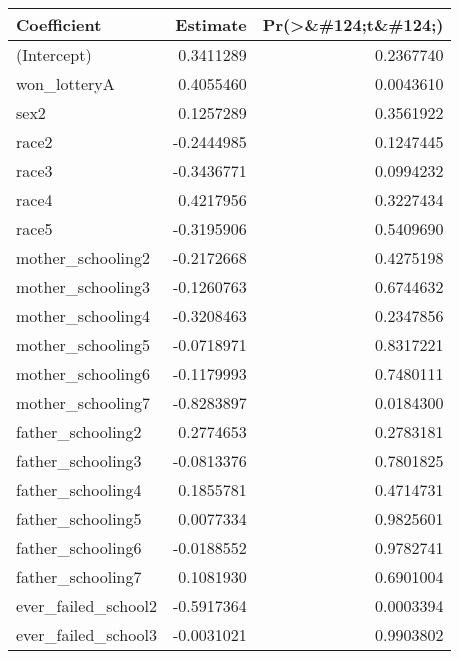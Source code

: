 \documentclass[
]{article}
\newenvironment{Shaded}{\begin{snugshade}}{\end{snugshade}}
\newcommand{\AttributeTok}[1]{\textcolor[rgb]{0.13,0.29,0.53}{#1}}
\newcommand{\DecValTok}[1]{\textcolor[rgb]{0.00,0.00,0.81}{#1}}
\newcommand{\FunctionTok}[1]{\textcolor[rgb]{0.13,0.29,0.53}{\textbf{#1}}}
\newcommand{\NormalTok}[1]{#1}
\newcommand{\OtherTok}[1]{\textcolor[rgb]{0.56,0.35,0.01}{#1}}
\newcommand{\SpecialCharTok}[1]{\textcolor[rgb]{0.81,0.36,0.00}{\textbf{#1}}}
\newcommand{\StringTok}[1]{\textcolor[rgb]{0.31,0.60,0.02}{#1}}
\begin{document}
\begin{longtable}[t]{lrr}
\toprule
Coefficient & Estimate & Pr(>\&\#124;t\&\#124;)\\
\midrule\relax
(Intercept) & 0.3411289 & 0.2367740\\
won\_lotteryA & 0.4055460 & 0.0043610\\
sex2 & 0.1257289 & 0.3561922\\
race2 & -0.2444985 & 0.1247445\\
race3 & -0.3436771 & 0.0994232\\
\addlinespace
race4 & 0.4217956 & 0.3227434\\
race5 & -0.3195906 & 0.5409690\\
mother\_schooling2 & -0.2172668 & 0.4275198\\
mother\_schooling3 & -0.1260763 & 0.6744632\\
mother\_schooling4 & -0.3208463 & 0.2347856\\
\addlinespace
mother\_schooling5 & -0.0718971 & 0.8317221\\
mother\_schooling6 & -0.1179993 & 0.7480111\\
mother\_schooling7 & -0.8283897 & 0.0184300\\
father\_schooling2 & 0.2774653 & 0.2783181\\
father\_schooling3 & -0.0813376 & 0.7801825\\
\addlinespace
father\_schooling4 & 0.1855781 & 0.4714731\\
father\_schooling5 & 0.0077334 & 0.9825601\\
father\_schooling6 & -0.0188552 & 0.9782741\\
father\_schooling7 & 0.1081930 & 0.6901004\\
ever\_failed\_school2 & -0.5917364 & 0.0003394\\
\addlinespace
ever\_failed\_school3 & -0.0031021 & 0.9903802\\
\bottomrule
\end{longtable}

\begin{Shaded}
\end{Shaded}
\end{document}
